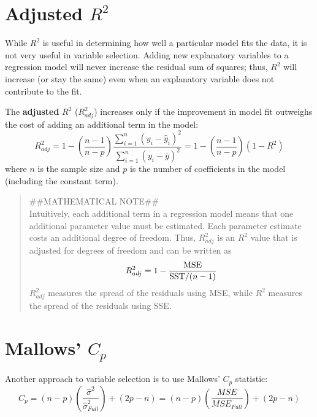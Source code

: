 \documentclass[
]{report}
\begin{document}
\hypertarget{adjusted-r2}{%
\section*{\texorpdfstring{Adjusted \(R^2\)}{Adjusted R\^{}2}}\label{adjusted-r2}}

While \(R^2\) is useful in determining how well a particular model fits the data, it is not very useful in variable selection. Adding new explanatory variables to a regression model will never increase the residual sum of squares; thus, \(R^2\) will increase (or stay the same) even when an explanatory variable does not contribute to the fit.

The \textbf{adjusted} \(R^2\) (\(R^2_{adj}\)) increases only if the improvement in model fit outweighs the cost of adding an additional term in the model:
\begin{equation}
R^2_{adj} = 1 - \left(\frac{n - 1}{n - p}\right)\frac{\sum_{i=1}^n (y_i - \hat{y}_i)^2}{\sum_{i=1}^n (y_i - \bar{y})^2}
= 1 - \left(\frac{n - 1}{n - p}\right)(1 - R^2)
\tag{3.13}
\end{equation}
where \(n\) is the sample size and \(p\) is the number of coefficients in the model (including the constant term).

\begin{quote}
\#\#MATHEMATICAL NOTE\#\#\\
Intuitively, each additional term in a regression model means that one additional parameter value must be estimated. Each parameter estimate costs an additional degree of freedom. Thus, \(R^2_{adj}\) is an \(R^2\) value that is adjusted for degrees of freedom and can be written as
\begin{equation}
R^2_{adj} = 1 - \frac{\text{MSE}}{\text{SST}/(n - 1)} \notag
\end{equation}
\(R^2_{adj}\) measures the spread of the residuals using MSE, while \(R^2\) measures the spread of the residuals using SSE.
\end{quote}

\hypertarget{mallows-c_p}{%
\section*{\texorpdfstring{Mallows' \(C_p\)}{Mallows' C\_p}}\label{mallows-c_p}}

Another approach to variable selection is to use Mallows' \(C_p\) statistic:
\begin{equation}
C_p = (n - p)\left(\frac{\hat{\sigma}^2}{\hat{\sigma}^2_{Full}}\right) + (2p - n)
= (n - p)\left(\frac{MSE}{MSE_{Full}}\right) + (2p - n)
\tag{3.14}
\end{equation}
\end{document}
